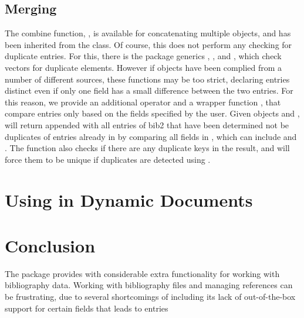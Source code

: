 \documentclass[article]{jss}\usepackage[]{graphicx}\usepackage[]{color}
\newcommand{\ourpkg}{\pkg{RefManageR}}
\begin{document}
\subsection{Merging}
The combine function, , is available for concatenating multiple  objects, and has been inherited from the  class.  Of course, this does not perform any checking for duplicate entries.  For this, there is the  package generics , , and , which check vectors for duplicate elements.  However if  objects have been complied from a number of different sources, these functions may be too strict, declaring entries distinct even if only one field has a small difference between the two entries.  For this reason, we provide an additional operator  and a wrapper function , that compare entries only based on the fields specified by the user.  Given  objects  and ,  will return  appended with all entries of bib2 that have been determined not be duplicates of entries already in  by comparing all fields in , which can include  and .  The function also checks if there are any duplicate keys in the result, and will force them to be unique if duplicates are detected using . 

\section[Using RefManageR for Citations]{Using \ourpkg{} in Dynamic Documents}\label{sec_cite}

\section{Conclusion}\label{sec_conc}
The \ourpkg{} package provides \R{} with considerable extra functionality for working with bibliography data.  Working with \Bibtex{} bibliography files and managing references can be frustrating, due to several shortcomings of \Bibtex{} including its lack of out-of-the-box support for certain fields that leads to entries 

\end{document}
